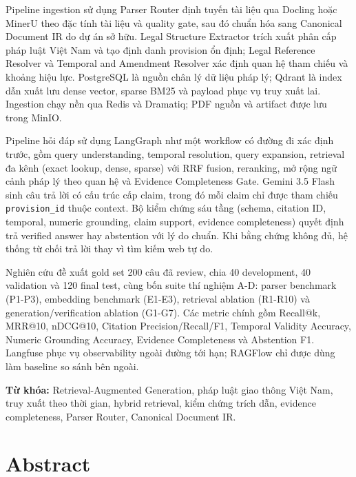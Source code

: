 \documentclass[a4paper,12pt]{extreport}
\newif\ifdraftmode
\newcommand{\draftnotice}{%
  \ifdraftmode
  \begin{center}
  \fcolorbox{DraftBorder}{DraftYellow}{%
    \parbox{0.90\textwidth}{%
      \centering\bfseries
      BẢN THẢO KỸ THUẬT - CHƯA CÓ KẾT QUẢ THỰC NGHIỆM CUỐI.\\
      Các bảng kết quả trong Chương 6 phải được thay bằng số liệu từ evaluation run đã đóng băng trước khi nộp.
    }
  }
  \end{center}
  \fi
}
\newcommand{\code}[1]{\texttt{#1}}
\begin{document}
Pipeline ingestion sử dụng Parser Router định tuyến tài liệu qua Docling hoặc MinerU theo đặc tính tài liệu và quality gate, sau đó chuẩn hóa sang Canonical Document IR do dự án sở hữu. Legal Structure Extractor trích xuất phân cấp pháp luật Việt Nam và tạo định danh provision ổn định; Legal Reference Resolver và Temporal and Amendment Resolver xác định quan hệ tham chiếu và khoảng hiệu lực. PostgreSQL là nguồn chân lý dữ liệu pháp lý; Qdrant là index dẫn xuất lưu dense vector, sparse BM25 và payload phục vụ truy xuất lai. Ingestion chạy nền qua Redis và Dramatiq; PDF nguồn và artifact được lưu trong MinIO.

Pipeline hỏi đáp sử dụng LangGraph như một workflow có đường đi xác định trước, gồm query understanding, temporal resolution, query expansion, retrieval đa kênh (exact lookup, dense, sparse) với RRF fusion, reranking, mở rộng ngữ cảnh pháp lý theo quan hệ và Evidence Completeness Gate. Gemini 3.5 Flash sinh câu trả lời có cấu trúc cấp claim, trong đó mỗi claim chỉ được tham chiếu \code{provision\_id} thuộc context. Bộ kiểm chứng sáu tầng (schema, citation ID, temporal, numeric grounding, claim support, evidence completeness) quyết định trả verified answer hay abstention với lý do chuẩn. Khi bằng chứng không đủ, hệ thống từ chối trả lời thay vì tìm kiếm web tự do.

\begin{sloppypar}
Nghiên cứu đề xuất gold set 200 câu đã review, chia 40 development, 40 validation và 120 final test, cùng bốn suite thí nghiệm A-D: parser benchmark (P1-P3), embedding benchmark (E1-E3), retrieval ablation (R1-R10) và generation/verification ablation (G1-G7). Các metric chính gồm Recall@k, MRR@10, nDCG@10, Citation Precision/Recall/F1, Temporal Validity Accuracy, Numeric Grounding Accuracy, Evidence Completeness và Abstention F1. Langfuse phục vụ observability ngoài đường tới hạn; RAGFlow chỉ được dùng làm baseline so sánh bên ngoài.
\end{sloppypar}

\draftnotice

\noindent\textbf{Từ khóa:} Retrieval-Augmented Generation, pháp luật giao thông Việt Nam, truy xuất theo thời gian, hybrid retrieval, kiểm chứng trích dẫn, evidence completeness, Parser Router, Canonical Document IR.
\clearpage

\chapter*{Abstract}
\end{document}
